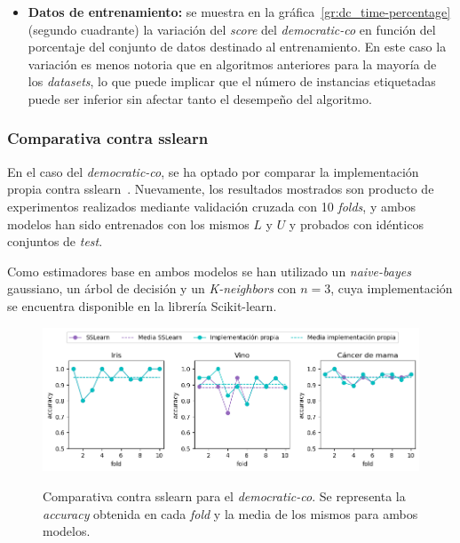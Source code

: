 \begin{itemize}
	\item \textbf{Datos de entrenamiento:} se muestra en la gráfica~\ref{gr:dc_time-percentage} (segundo cuadrante) la variación del \textit{score} del \textit{democratic-co} en función del porcentaje del conjunto de datos destinado al entrenamiento. En este caso la variación es menos notoria que en algoritmos anteriores para la mayoría de los \textit{datasets}, lo que puede implicar que el número de instancias etiquetadas puede ser inferior sin afectar tanto el desempeño del algoritmo.
	
	
\end{itemize} 


\subsubsection{Comparativa contra sslearn}

En el caso del \textit{democratic-co}, se ha optado por comparar la implementación propia contra sslearn~\cite{sslearnRepo}. Nuevamente, los resultados mostrados son producto de experimentos realizados mediante validación cruzada con 10 \textit{folds}, y ambos modelos han sido entrenados con los mismos $L$ y $U$ y probados con idénticos conjuntos de \textit{test}.

Como estimadores base en ambos modelos se han utilizado un \textit{naive-bayes} gaussiano, un árbol de decisión y un \textit{K-neighbors} con $n = 3$, cuya implementación se encuentra disponible en la librería Scikit-learn.

\begin{figure}[h]
	\caption[\textit{Democratic-co}: comparativa contra \textit{sslearn}]{Comparativa contra sslearn para el \textit{democratic-co}. Se representa la \textit{accuracy} obtenida en cada \textit{fold} y la media de los mismos para ambos modelos.}
	\centering
	\includegraphics[scale=0.62]{../img/memoria/5_democraticco_sslearn}
	\label{gr:dc_vs_sslearn}
\end{figure}

